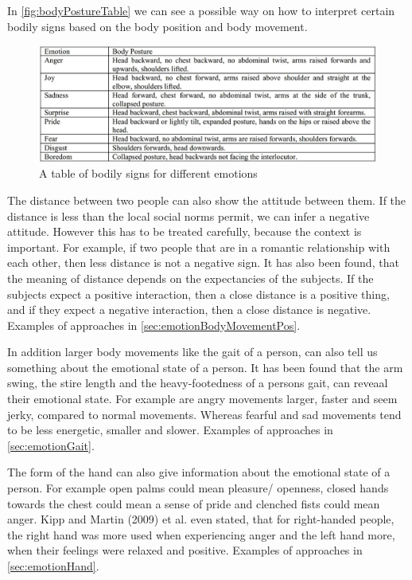 \documentclass[conference]{IEEEtran}
\begin{document}
In \autoref{fig:bodyPostureTable} we can see a possible way on how to interpret certain bodily signs based on the body position and body movement. 
\begin{figure}
\centering
   \includegraphics[width=\linewidth]{bodyPostureTable.jpg}
  \caption{A table of bodily signs for different emotions\cite{singhsignificance}}
  \label{fig:bodyPostureTable}
\end{figure}
The distance between two people can also show the attitude between them. If the distance is less than the local social norms permit, we can infer a negative attitude\cite{mehrabian1969significance}. However this has to be treated carefully, because the context is important. For example, if two people that are in a romantic relationship with each other, then less distance is not a negative sign. It has also been found, that the meaning of distance depends on the expectancies of the subjects. If the subjects expect a positive interaction, then a close distance is a positive thing, and if they expect a negative interaction, then a close distance is negative\cite{mehrabian1969significance}. Examples of approaches in \autoref{sec:emotionBodyMovementPos}.\

In addition larger body movements like the gait of a person, can also tell us something about the emotional state of a person. It has been found that the arm swing, the stire length and the heavy-footedness of a persons gait, can reveaal their emotional state\cite{montepare1987identification}. For example are angry movements larger, faster and seem jerky, compared to normal movements\cite{singhsignificance}. Whereas fearful and sad movements tend to be less energetic, smaller and slower\cite{singhsignificance}. Examples of approaches in \autoref{sec:emotionGait}.\


The form of the hand can also give information about the emotional state of a person. For example open palms could mean pleasure/ openness, closed hands towards the chest could mean a sense of pride and clenched fists could mean anger\cite{beale2008affect,singh2015edbl}. Kipp and Martin (2009) et al.\cite{kipp2009gesture} even stated, that for right-handed people, the right hand was more used when experiencing anger and the left hand more, when their feelings were relaxed and positive. Examples of approaches in \autoref{sec:emotionHand}.
\end{document}
